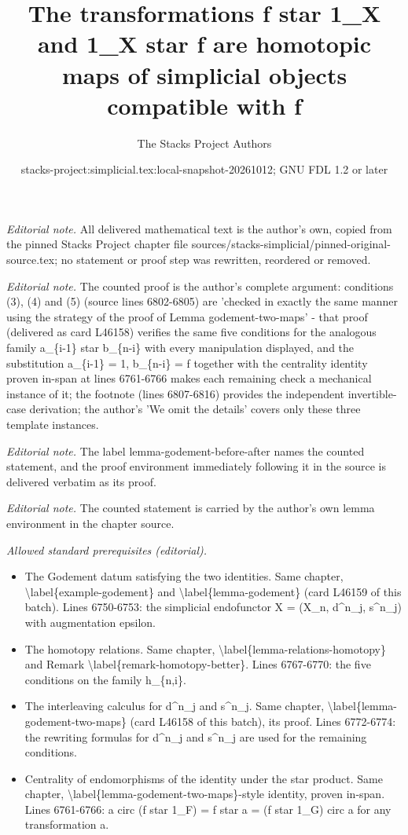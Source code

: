 \documentclass{stacks-project}
\title{The transformations f star 1\_X and 1\_X star f are homotopic maps of simplicial objects compatible with f}
\author{The Stacks Project Authors}
\date{stacks-project:simplicial.tex:local-snapshot-20261012; GNU FDL 1.2 or later}
\theoremstyle{plain}
\theoremstyle{definition}
\theoremstyle{remark}
\numberwithin{equation}{subsection}
\begin{document}
\maketitle
\noindent\textit{Editorial note.} All delivered mathematical text is the author's own, copied from the pinned Stacks Project chapter file sources/stacks-simplicial/pinned-original-source.tex; no statement or proof step was rewritten, reordered or removed.\par\medskip
\noindent\textit{Editorial note.} The counted proof is the author's complete argument: conditions (3), (4) and (5) (source lines 6802-6805) are 'checked in exactly the same manner using the strategy of the proof of Lemma godement-two-maps' - that proof (delivered as card L46158) verifies the same five conditions for the analogous family a\_\{i-1\} star b\_\{n-i\} with every manipulation displayed, and the substitution a\_\{i-1\} = 1, b\_\{n-i\} = f together with the centrality identity proven in-span at lines 6761-6766 makes each remaining check a mechanical instance of it; the footnote (lines 6807-6816) provides the independent invertible-case derivation; the author's 'We omit the details' covers only these three template instances.\par\medskip
\noindent\textit{Editorial note.} The label lemma-godement-before-after names the counted statement, and the proof environment immediately following it in the source is delivered verbatim as its proof.\par\medskip
\noindent\textit{Editorial note.} The counted statement is carried by the author's own lemma environment in the chapter source.\par\medskip
\noindent\textit{Allowed standard prerequisites (editorial).}\begin{itemize}
\item The Godement datum satisfying the two identities. Same chapter, \textbackslash{}label\{example-godement\} and \textbackslash{}label\{lemma-godement\} (card L46159 of this batch). Lines 6750-6753: the simplicial endofunctor X = (X\_n, d\textasciicircum{}n\_j, s\textasciicircum{}n\_j) with augmentation epsilon.
\item The homotopy relations. Same chapter, \textbackslash{}label\{lemma-relations-homotopy\} and Remark \textbackslash{}label\{remark-homotopy-better\}. Lines 6767-6770: the five conditions on the family h\_\{n,i\}.
\item The interleaving calculus for d\textasciicircum{}n\_j and s\textasciicircum{}n\_j. Same chapter, \textbackslash{}label\{lemma-godement-two-maps\} (card L46158 of this batch), its proof. Lines 6772-6774: the rewriting formulas for d\textasciicircum{}n\_j and s\textasciicircum{}n\_j are used for the remaining conditions.
\item Centrality of endomorphisms of the identity under the star product. Same chapter, \textbackslash{}label\{lemma-godement-two-maps\}-style identity, proven in-span. Lines 6761-6766: a circ (f star 1\_F) = f star a = (f star 1\_G) circ a for any transformation a.
\end{itemize}\medskip
\end{document}
